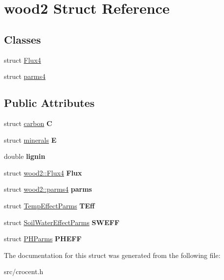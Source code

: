 \hypertarget{structwood2}{\section{wood2 Struct Reference}
\label{structwood2}
}
\subsection*{Classes}
\begin{DoxyCompactItemize}
\item 
struct \hyperlink{structwood2_1_1_flux4}{Flux4}
\item 
struct \hyperlink{structwood2_1_1parms4}{parms4}
\end{DoxyCompactItemize}
\subsection*{Public Attributes}
\begin{DoxyCompactItemize}
\item 
\hypertarget{structwood2_aa263c5e5d4748c12f5c1ad4a18ad8080}{struct \hyperlink{structcarbon}{carbon} {\bfseries C}}\label{structwood2_aa263c5e5d4748c12f5c1ad4a18ad8080}

\item 
\hypertarget{structwood2_a09fa4e06c0fd1ba7286ca328919eb30b}{struct \hyperlink{structminerals}{minerals} {\bfseries E}}\label{structwood2_a09fa4e06c0fd1ba7286ca328919eb30b}

\item 
\hypertarget{structwood2_a632ab82d3a10445fc4dffe85d8418b42}{double {\bfseries lignin}}\label{structwood2_a632ab82d3a10445fc4dffe85d8418b42}

\item 
\hypertarget{structwood2_a73802805efbd020ef06c58d7f34b7655}{struct \hyperlink{structwood2_1_1_flux4}{wood2\-::\-Flux4} {\bfseries Flux}}\label{structwood2_a73802805efbd020ef06c58d7f34b7655}

\item 
\hypertarget{structwood2_a9c2367d3bb352723971760c089c51dbf}{struct \hyperlink{structwood2_1_1parms4}{wood2\-::parms4} {\bfseries parms}}\label{structwood2_a9c2367d3bb352723971760c089c51dbf}

\item 
\hypertarget{structwood2_ab13f60748d4d396c77f4c6611594fe20}{struct \hyperlink{struct_temp_effect_parms}{Temp\-Effect\-Parms} {\bfseries T\-Eff}}\label{structwood2_ab13f60748d4d396c77f4c6611594fe20}

\item 
\hypertarget{structwood2_a339ec400ba3e6be21f290a7eabede801}{struct \hyperlink{struct_soil_water_effect_parms}{Soil\-Water\-Effect\-Parms} {\bfseries S\-W\-E\-F\-F}}\label{structwood2_a339ec400ba3e6be21f290a7eabede801}

\item 
\hypertarget{structwood2_ac9abb28c0c12e5706f8c693dcfcb39cc}{struct \hyperlink{struct_p_h_parms}{P\-H\-Parms} {\bfseries P\-H\-E\-F\-F}}\label{structwood2_ac9abb28c0c12e5706f8c693dcfcb39cc}

\end{DoxyCompactItemize}


The documentation for this struct was generated from the following file\-:\begin{DoxyCompactItemize}
\item 
src/crocent.\-h\end{DoxyCompactItemize}
